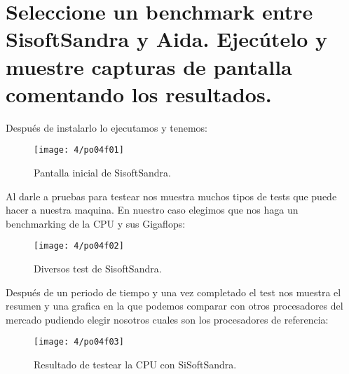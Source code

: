 \section{Seleccione un benchmark entre SisoftSandra y Aida.	Ejecútelo y muestre capturas de pantalla comentando los resultados.}

Después de instalarlo lo ejecutamos y tenemos:
\begin{figure}[H]
\centering
\texttt{[image: 4/po04f01]}
\caption{Pantalla inicial de SisoftSandra.}
\label{fig:f36}
\end{figure}

Al darle a pruebas para testear nos muestra muchos tipos de tests que puede hacer a nuestra maquina. En nuestro caso elegimos que nos haga un benchmarking de la CPU y sus Gigaflops:

\begin{figure}[H]
\centering
\texttt{[image: 4/po04f02]}
\caption{Diversos test de SisoftSandra.}
\label{fig:f37}
\end{figure}


Después de un periodo de tiempo y una vez completado el test nos muestra el resumen y una grafica en la que podemos comparar con otros procesadores del mercado pudiendo elegir nosotros cuales son los procesadores de referencia:

\begin{figure}[H]
\centering
\texttt{[image: 4/po04f03]}
\caption{Resultado de testear la CPU con SiSoftSandra.}
\label{fig:f38}
\end{figure}





\clearpage



